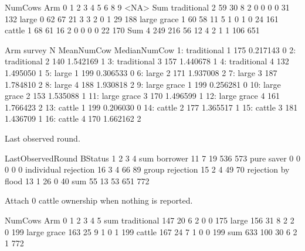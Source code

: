 \begin{Schunk}
\begin{Soutput}
             NumCows
Arm             0   1   2   3   4   5   6   8   9 <NA> Sum
  traditional   2  59  30   8   2   0   0   0   0   31 132
  large         0  62  67  21   3   3   2   0   1   29 188
  large grace   1  60  58  11   5   1   0   1   0   24 161
  cattle        1  68  61  16   2   0   0   0   0   22 170
  Sum           4 249 216  56  12   4   2   1   1  106 651
\end{Soutput}
\begin{Soutput}
            Arm survey   N MeanNumCow MedianNumCow
 1: traditional      1 175   0.217143            0
 2: traditional      2 140   1.542169            1
 3: traditional      3 157   1.440678            1
 4: traditional      4 132   1.495050            1
 5:       large      1 199   0.306533            0
 6:       large      2 171   1.937008            2
 7:       large      3 187   1.784810            2
 8:       large      4 188   1.930818            2
 9: large grace      1 199   0.256281            0
10: large grace      2 153   1.535088            1
11: large grace      3 170   1.496599            1
12: large grace      4 161   1.766423            2
13:      cattle      1 199   0.206030            0
14:      cattle      2 177   1.365517            1
15:      cattle      3 181   1.436709            1
16:      cattle      4 170   1.662162            2
\end{Soutput}
\end{Schunk}
Last observed round.
\begin{Schunk}
\begin{Soutput}
                      LastObservedRound
BStatus                  1   2   3   4 sum
  borrower              11   7  19 536 573
  pure saver             0   0   0   0   0
  individual rejection  16   3   4  66  89
  group rejection       15   2   4  49  70
  rejection by flood    13   1  26   0  40
  sum                   55  13  53 651 772
\end{Soutput}
\end{Schunk}
Attach 0 cattle ownership when nothing is reported.
\begin{Schunk}
\begin{Soutput}
             NumCows
Arm             0   1   2   3   4   5 sum
  traditional 147  20   6   2   0   0 175
  large       156  31   8   2   2   0 199
  large grace 163  25   9   1   0   1 199
  cattle      167  24   7   1   0   0 199
  sum         633 100  30   6   2   1 772
\end{Soutput}
\end{Schunk}
